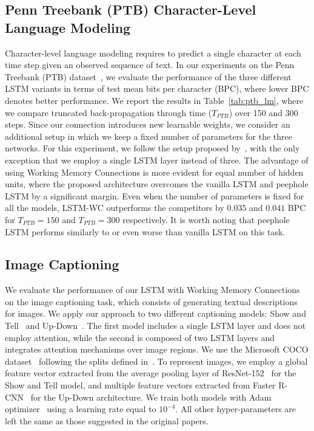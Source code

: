 

\subsection{Penn Treebank (PTB) Character-Level Language Modeling}
Character-level language modeling requires to predict a single character at each time step given an observed sequence of text. In our experiments on the Penn Treebank (PTB) dataset~\citep{marcus1993building}, we evaluate the performance of the three different LSTM variants in terms of test mean bits per character (BPC), where lower BPC denotes better performance. We report the results in Table~\ref{tab:ptb_lm}, where we compare truncated back-propagation through time ($T_{PTB}$) over 150 and 300 steps. Since our connection introduces new learnable weights, we consider an additional setup in which we keep a fixed number of parameters for the three networks.
For this experiment, we follow the setup proposed by~\citet{merityAnalysis}, with the only exception that we employ a single LSTM layer instead of three.
%
The advantage of using Working Memory Connections is more evident for equal number of hidden units, where the proposed architecture overcomes the vanilla LSTM and peephole LSTM by a significant margin. Even when the number of parameters is fixed for all the models, LSTM-WC outperforms the competitors by $0.035$ and $0.041$ BPC for $T_{PTB} = 150$ and $T_{PTB}=300$ respectively. It is worth noting that peephole LSTM performs similarly to or even worse than vanilla LSTM on this task.

\subsection{Image Captioning}
We evaluate the performance of our LSTM with Working Memory Connections on the image captioning task, which consists of generating textual descriptions for images. We apply our approach to two different captioning models: Show and Tell~\citep{vinyals2015show} and Up-Down~\citep{anderson2018bottom}. The first model includes a single LSTM layer and does not employ attention, while the second is composed of two LSTM layers and integrates attention mechanisms over image regions. We use the Microsoft COCO dataset~\citep{lin2014microsoft} following the splits defined in~\citep{karpathy2015deep}. To represent images, we employ a global feature vector extracted from the average pooling layer of ResNet-152~\citep{he2016deep} for the Show and Tell model, and multiple feature vectors extracted from Faster R-CNN~\citep{ren2015faster} for the Up-Down architecture. We train both models with Adam optimizer~\citep{kingma2015adam} using a learning rate equal to $10^{-4}$. All other hyper-parameters are left the same as those suggested in the original papers.

